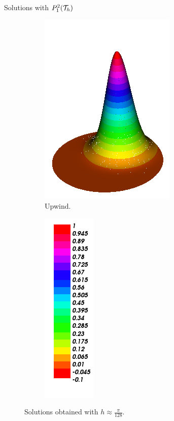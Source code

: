 \begin{frame}{Solutions with $\relax{P}_1^2(\mathcal{T}_h)$}
\begin{figure}[h!]
\begin{subfigure}[b]{0.27\textwidth}
				\includegraphics[scale=0.22]{img/Conveccion_Reaccion/Recortes/steady_convect_react_approx_UPW_n_256.png}
				\caption{Upwind.}
			\end{subfigure}
			\begin{subfigure}[b]{0.15\textwidth}
				\centering
				\includegraphics[scale=0.22]{img/Conveccion_Reaccion/Recortes/steady_convect_react_values.png}
			\end{subfigure}
			\caption{Solutions obtained with $h\approx\frac{\pi}{128}$.}
		\end{figure}
		\end{frame}
		
